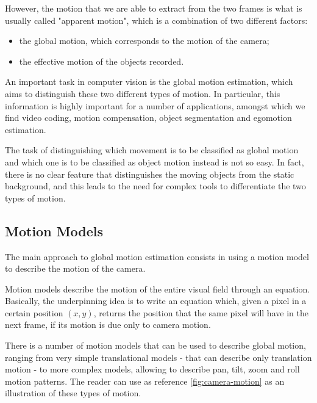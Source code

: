 However, the motion that we are able to extract from the two frames is what is usually called "apparent motion", which is a combination of two different factors:
\begin{itemize}
    \item the global motion, which corresponds to the motion of the camera;
    \item the effective motion of the objects recorded.
\end{itemize}

An important task in computer vision is the global motion estimation, which aims to distinguish these two different types of motion.
In particular, this information is highly important for a number of applications, amongst which we find video coding, motion compensation, object segmentation and egomotion estimation.

The task of distinguishing which movement is to be classified as global motion and which one is to be classified as object motion instead is not so easy. In fact, there is no clear feature that distinguishes the moving objects from the static background, and this leads to the need for complex tools to differentiate the two types of motion.


\subsection{Motion Models}
\label{sec:motion-models}

The main approach to global motion estimation consists in using a motion model to describe the motion of the camera.

Motion models describe the motion of the entire visual field through an equation. Basically, the underpinning idea is to write an equation which, given a pixel in a certain position $(x,y)$, returns the position that the same pixel will have in the next frame, if its motion is due only to camera motion.

There is a number of motion models that can be used to describe global motion, ranging from very simple translational models - that can describe only translation motion - to more complex models, allowing to describe pan, tilt, zoom and roll motion patterns. The reader can use as reference \cref{fig:camera-motion} as an illustration of these types of motion.

